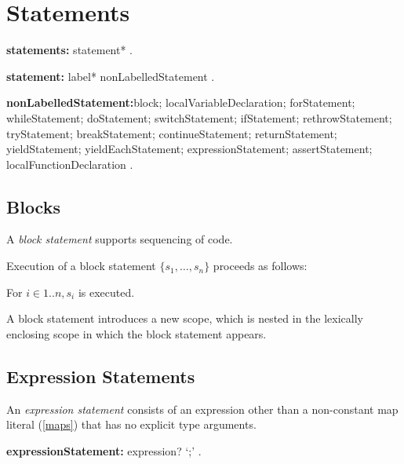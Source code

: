 \documentclass{article}
\begin{document}
\section{Statements}

 \begin{grammar}
{\bf statements:}
      statement*
    .


{\bf statement:}
      label* nonLabelledStatement
    .

{\bf nonLabelledStatement:}block; 
      localVariableDeclaration;
      forStatement;
      whileStatement;
      doStatement;
      switchStatement;
      ifStatement;
      rethrowStatement;
      tryStatement;
      breakStatement;
      continueStatement;
      returnStatement;
      yieldStatement;
      yieldEachStatement;
      expressionStatement;
      assertStatement;
      localFunctionDeclaration
    .
 \end{grammar}
 
 \subsection{Blocks}
 
\LMHash{}
 A {\em block statement} supports sequencing of code.

\LMHash{}
Execution of a block statement $\{s_1, \ldots,  s_n\}$ proceeds as follows:

\LMHash{}
For $i \in 1 .. n, s_i$ is executed.

\LMHash{}
A block statement introduces a new scope, which is nested in the lexically enclosing scope in which the block statement appears.



 \subsection{Expression Statements}
 
\LMHash{}
An {\em expression statement} consists of an expression other than a non-constant map literal (\ref{maps}) that has no explicit type arguments. 


 \begin{grammar}
{\bf expressionStatement:}
  expression? `{\escapegrammar ;}'
  .
 \end{grammar}
 
\end{document}
